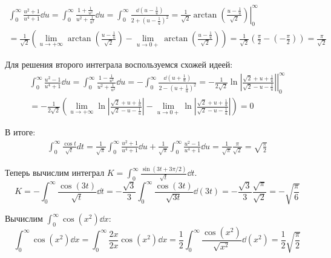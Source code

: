 \[
\begin{split}
  \int_{0}^{\infty} \frac{u^2 + 1}{u^4 + 1} \dd u
  = \int_{0}^{\infty} \frac{1 + \frac{1}{u^2}}{u^2 + \frac{1}{u^2}} \dd u
  = \int_{0}^{\infty}
  \frac{\dd \left(u - \frac{1}{u}\right)}{2 + {\left(u - \frac{1}{u}\right)}^2}
  = \frac{1}{\sqrt{2}} \left.
  \arctan \left(\frac{u - \frac{1}{u}}{\sqrt{2}}\right)
  \right\rvert_{0}^{\infty} \\
  = \frac{1}{\sqrt{2}} \left(
  \lim_{u \to +\infty} \arctan \left(\frac{u - \frac{1}{u}}{\sqrt{2}}\right)
  - \lim_{u \to 0+} \arctan \left(\frac{u - \frac{1}{u}}{\sqrt{2}}\right)
  \right)
  = \frac{1}{\sqrt{2}} \left( \frac{\pi}{2} - \left(-\frac{\pi}{2}\right)\right)
  = \frac{\pi}{\sqrt{2}}
\end{split}
\]

Для решения второго интеграла воспользуемся схожей идеей:
\[
\begin{split}
  \int_{0}^{\infty} \frac{u^2 - 1}{u^4 + 1} \dd u
  = \int_{0}^{\infty} \frac{1 - \frac{1}{u^2}}{u^2 + \frac{1}{u^2}} \dd u
  = -\int_{0}^{\infty}
  \frac{\dd \left(u + \frac{1}{u}\right)}{2 - {\left(u + \frac{1}{u}\right)}^2}
  = -\left.\frac{1}{2\sqrt{2}}\ln\left|\frac{\sqrt{2} + u + \frac{1}{u}}{\sqrt{2} - u - \frac{1}{u}}\right|\right\rvert_{0}^{\infty} \\
  = -\frac{1}{2\sqrt{2}} \left(
  \lim_{u \to +\infty} \ln\left|\frac{\sqrt{2} + u + \frac{1}{u}}{\sqrt{2} - u - \frac{1}{u}}\right|
  - \lim_{u \to 0+} \ln\left|\frac{\sqrt{2} + u + \frac{1}{u}}{\sqrt{2} - u - \frac{1}{u}}\right|
  \right) = 0
\end{split}
\]

В итоге:
\[
\begin{split}
  \int_{0}^{\infty} \frac{\cos t}{\sqrt{t}} dt
  = \frac{1}{\sqrt{\pi}} \int_{0}^{\infty} \frac{u^2 + 1}{u^4 + 1} \dd u
  + \frac{1}{\sqrt{\pi}} \int_{0}^{\infty} \frac{u^2 - 1}{u^4 + 1} \dd u
  = \frac{1}{\sqrt{\pi}} \frac{\pi}{\sqrt{2}} = \sqrt{\frac{\pi}{2}}
\end{split}
\]

Теперь вычислим интеграл
\(K = \int_{0}^{\infty} \frac{\sin(3t + 3\pi/2)}{\sqrt{t}} \dd t\).
\[
  K
  = -\int_{0}^{\infty} \frac{\cos(3t)}{\sqrt{t}} \dd t
  = -\frac{\sqrt{3}}{3} \int_{0}^{\infty} \frac{\cos(3t)}{\sqrt{3t}} \dd(3t)
  = -\frac{\sqrt{3}}{3} \frac{\sqrt{\pi}}{\sqrt{2}}
  = -\sqrt{\frac{\pi}{6}}
\]

Вычислим \(\int_{0}^{\infty} \cos(x^2) \dd x\):
\[
  \int_{0}^{\infty} \cos(x^2) \dd x
  = \int_{0}^{\infty} \frac{2x}{2x} \cos(x^2) \dd x
  = \frac{1}{2} \int_{0}^{\infty} \frac{\cos(x^2)}{\sqrt{x^2}} \dd (x^2)
  = \frac{1}{2} \sqrt{\frac{\pi}{2}}
\]

